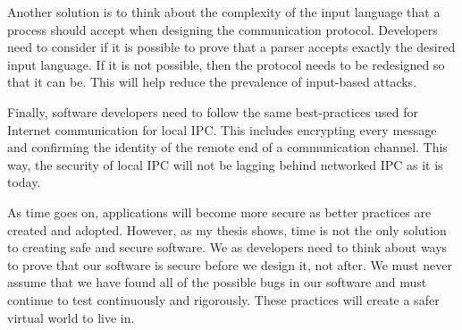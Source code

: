 Another solution is to think about the complexity of the input language that a process should accept when designing the communication protocol.  Developers need to consider if it is possible to prove that a parser accepts exactly the desired input language.  If it is not possible, then the protocol needs to be redesigned so that it can be.  This will help reduce the prevalence of input-based attacks.

Finally, software developers need to follow the same best-practices used for Internet communication for local IPC.  This includes encrypting every message and confirming the identity of the remote end of a communication channel.  This way, the security of local IPC will not be lagging behind networked IPC as it is today.

As time goes on, applications will become more secure as better practices are created and adopted.  However, as my thesis shows, time is not the only solution to creating safe and secure software.  We as developers need to think about ways to prove that our software is secure before we design it, not after.  We must never assume that we have found all of the possible bugs in our software and must continue to test continuously and rigorously.  These practices will create a safer virtual world to live in.
